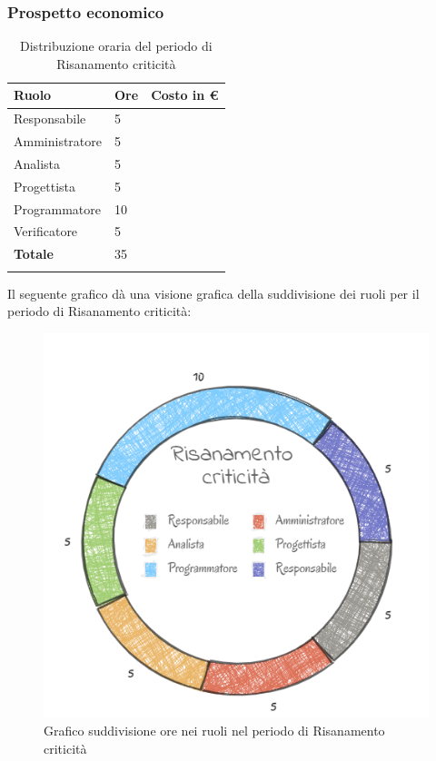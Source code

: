 \subsubsection{Prospetto economico}
\begin{longtable}{| C{.30\textwidth}| C{.15\textwidth}| C{.20\textwidth}|}
	\hline
	\textbf{Ruolo} & \textbf{Ore} & \textbf{Costo in \euro} \\
	\hline 
	Responsabile & 5 &  \\
	\hline
	Amministratore & 5 &  \\
	\hline
	Analista & 5 &  \\
	\hline
	Progettista & 5 & \\
	\hline
	Programmatore & 10 &  \\
	\hline 
	Verificatore & 5 &  \\
	\hline
	\textbf{Totale} & 35 &  \\
	\hline 


\caption{Distribuzione oraria del periodo di Risanamento criticità}
\label{Distribuzione oraria del periodo di Risanamento criticità}
\end{longtable}

Il seguente grafico dà una visione grafica della suddivisione dei ruoli per il periodo di Risanamento criticità:\begin{figure}[H]
	\centering
	\includegraphics[width=0.8\linewidth]{./images/torta_risanamento3.png}
	\caption{Grafico suddivisione ore nei ruoli nel periodo di Risanamento criticità}
	\label{fig:grafico suddivione ruoli nel periodo di Risanamento criticità}
\end{figure}


